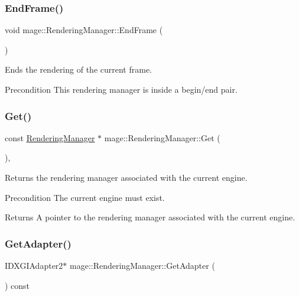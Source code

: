 \subsubsection{\texorpdfstring{End\+Frame()}{EndFrame()}}
{\footnotesize\ttfamily void mage\+::\+Rendering\+Manager\+::\+End\+Frame (\begin{DoxyParamCaption}{ }\end{DoxyParamCaption})\hspace{0.3cm}{\ttfamily [noexcept]}}

Ends the rendering of the current frame.

\begin{DoxyPrecond}{Precondition}
This rendering manager is inside a begin/end pair. 
\end{DoxyPrecond}
\hypertarget{classmage_1_1_rendering_manager_a920fdd741d160b687ecac1d892f8bfd1}{}\label{classmage_1_1_rendering_manager_a920fdd741d160b687ecac1d892f8bfd1} 
\subsubsection{\texorpdfstring{Get()}{Get()}}
{\footnotesize\ttfamily const \hyperlink{classmage_1_1_rendering_manager}{Rendering\+Manager} $\ast$ mage\+::\+Rendering\+Manager\+::\+Get (\begin{DoxyParamCaption}{ }\end{DoxyParamCaption})\hspace{0.3cm}{\ttfamily [static]}, {\ttfamily [noexcept]}}

Returns the rendering manager associated with the current engine.

\begin{DoxyPrecond}{Precondition}
The current engine must exist. 
\end{DoxyPrecond}
\begin{DoxyReturn}{Returns}
A pointer to the rendering manager associated with the current engine. 
\end{DoxyReturn}
\hypertarget{classmage_1_1_rendering_manager_a571d71069797cd6040f48646d8ce6896}{}\label{classmage_1_1_rendering_manager_a571d71069797cd6040f48646d8ce6896} 
\subsubsection{\texorpdfstring{Get\+Adapter()}{GetAdapter()}}
{\footnotesize\ttfamily I\+D\+X\+G\+I\+Adapter2$\ast$ mage\+::\+Rendering\+Manager\+::\+Get\+Adapter (\begin{DoxyParamCaption}{ }\end{DoxyParamCaption}) const\hspace{0.3cm}{\ttfamily [noexcept]}}

